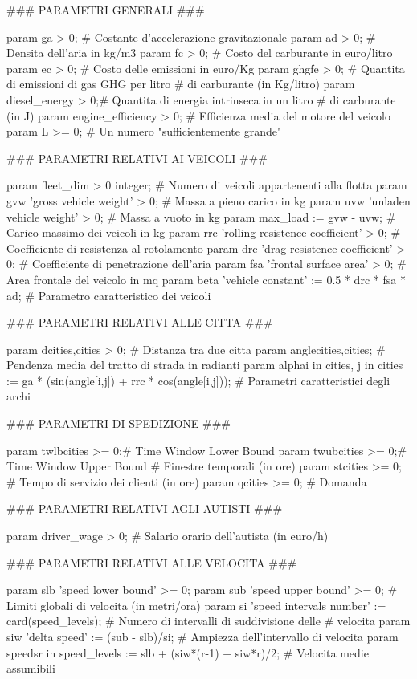 		\begin{amplcode}
			### PARAMETRI GENERALI ###

			param ga > 0;			# Costante d'accelerazione gravitazionale
			param ad > 0; 			# Densita dell'aria in kg/m3
			param fc > 0;			# Costo del carburante in euro/litro
			param ec > 0;			# Costo delle emissioni in euro/Kg
			param ghgfe > 0;		# Quantita di emissioni di gas GHG per litro
									# di carburante (in Kg/litro)
			param diesel_energy > 0;# Quantita di energia intrinseca in un litro
									# di carburante (in J)
			param engine_efficiency > 0;
									# Efficienza media del motore del veicolo
			param L >= 0;			# Un numero "sufficientemente grande"


			### PARAMETRI RELATIVI AI VEICOLI ###

			param fleet_dim > 0 integer;	
									# Numero di veicoli appartenenti alla flotta
			param gvw 'gross vehicle weight' > 0;				
									# Massa a pieno carico in kg
			param uvw 'unladen vehicle weight' > 0;
									# Massa a vuoto in kg
			param max_load := gvw - uvw;	# Carico massimo dei veicoli in kg
			param rrc 'rolling resistence coefficient' > 0;
									# Coefficiente di resistenza al rotolamento
			param drc 'drag resistence coefficient' > 0;
									# Coefficiente di penetrazione dell'aria
			param fsa 'frontal surface area' > 0;
									# Area frontale del veicolo in mq
			param beta 'vehicle constant' := 0.5 * drc * fsa * ad;										# Parametro caratteristico dei veicoli
										
										
			### PARAMETRI RELATIVI ALLE CITTA ###

			param d{cities,cities} > 0; 	
									# Distanza tra due citta
			param angle{cities,cities};		
									# Pendenza media del tratto di strada in radianti
			param alpha{i in cities, j in cities} := 
				ga * (sin(angle[i,j]) + rrc * cos(angle[i,j]));
									# Parametri caratteristici degli archi


			### PARAMETRI DI SPEDIZIONE ###

			param twlb{cities} >= 0;# Time Window Lower Bound
			param twub{cities} >= 0;# Time Window Upper Bound
									# Finestre temporali (in ore)
			param st{cities} >= 0;	# Tempo di servizio dei clienti (in ore)
			param q{cities} >= 0;	# Domanda


			### PARAMETRI RELATIVI AGLI AUTISTI ###

			param driver_wage > 0; 	# Salario orario dell'autista (in euro/h)


			### PARAMETRI RELATIVI ALLE VELOCITA ###

			param slb 'speed lower bound' >= 0;
			param sub 'speed upper bound' >= 0;
									# Limiti globali di velocita (in metri/ora)
			param si 'speed intervals number' := card(speed_levels);
									# Numero di intervalli di suddivisione delle 
									# velocita
			param siw 'delta speed' := (sub - slb)/si;
									# Ampiezza dell'intervallo di velocita
			param speeds{r in speed_levels} := slb + (siw*(r-1) + siw*r)/2;
									# Velocita medie assumibili
		\end{amplcode}

